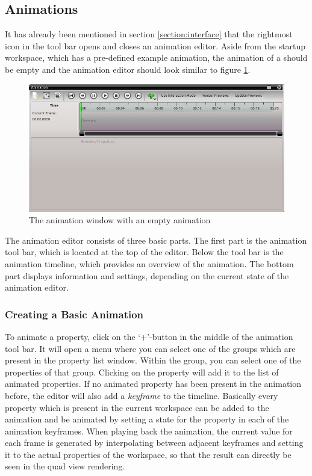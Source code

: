 \subsection{Animations}
\label{section:animation_editor}

It has already been mentioned in section \ref{section:interface} that the rightmost icon in the \Voreen tool bar opens and closes an animation editor.
Aside from the \Voreen startup workspace, which has a pre-defined example animation, the animation of a \workspace should be empty and the animation 
editor should look similar to figure \ref{fig:animation_window}.

\begin{figure}[htb]
 \centering
 \includegraphics[scale=0.5,keepaspectratio=true]{./images/animation_window.png}
 \caption{The animation window with an empty animation}
 \label{fig:animation_window}
\end{figure}

The animation editor consists of three basic parts. The first part is the animation tool bar, which is located at the top of the editor. Below the tool bar is the 
animation timeline, which provides an overview of the animation. The bottom part displays information and settings, depending on the current state of the animation
editor. 

\subsubsection{Creating a Basic Animation}
To animate a property, click on the `+'-button in the middle of the animation tool bar. It will open a menu where you can select one of the groups 
which are present in the property list window. Within the group, you can select one of the properties of that group. Clicking on the property will add 
it to the list of animated properties. If no animated property has been present in the animation before, the editor will also add a \emph{keyframe} to the
timeline. Basically every property which is present in the current workspace can be added to the animation and be animated by setting a state for the property
in each of the animation keyframes. When playing back the animation, the current value for each frame is generated by interpolating between adjacent keyframes and 
setting it to the actual properties of the workspace, so that the result can directly be seen in the quad view rendering.

